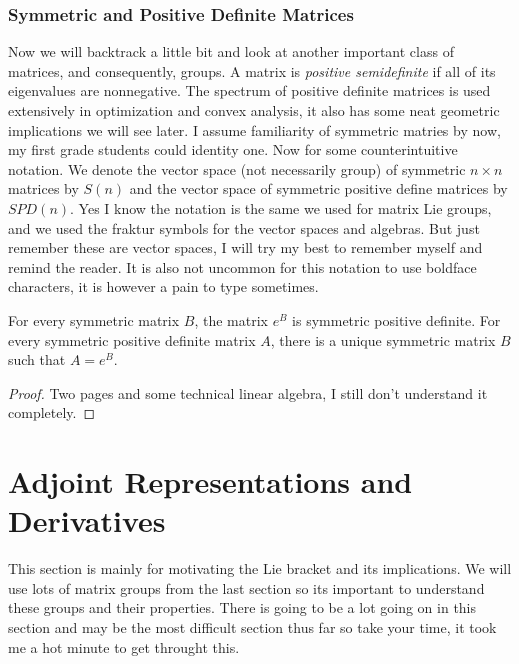 \subsubsection{Symmetric and Positive Definite Matrices}
Now we will backtrack a little bit and look at another important class of matrices,
and consequently, groups. A matrix is \textit{positive semidefinite} if all of its
eigenvalues are nonnegative. The spectrum of positive definite matrices is used
extensively in optimization and convex analysis, it also has some neat geometric
implications we will see later. I assume familiarity of symmetric matries by now,
my first grade students could identity one. Now for some counterintuitive notation.
We denote the vector space (not necessarily group) of symmetric $n\times n$ matrices by $S(n)$
and the vector space of symmetric positive define matrices by $SPD(n)$. Yes I know
the notation is the same we used for matrix Lie groups, and we used the fraktur symbols for
the vector spaces and algebras. But just remember these are vector spaces, I will
try my best to remember myself and remind the reader. It is also not uncommon for
this notation to use boldface characters, it is however a pain to type sometimes.

\begin{boxprop}{}{}
    For every symmetric matrix $B$, the matrix $e^B$ is symmetric positive definite.
    For every symmetric positive definite matrix $A$, there is a unique symmetric
    matrix $B$ such that $A=e^B$.
    \begin{proof}
        Two pages and some technical linear algebra, I still don't understand it
        completely. 
    \end{proof}
\end{boxprop}

\section{Adjoint Representations and Derivatives}
This section is mainly for motivating the Lie bracket and its implications. We will
use lots of matrix groups from the last section so its important to understand
these groups and their properties. There is going to be a lot going on in this section
and may be the most difficult section thus far so take your time, it took me a hot
minute to get throught this.

